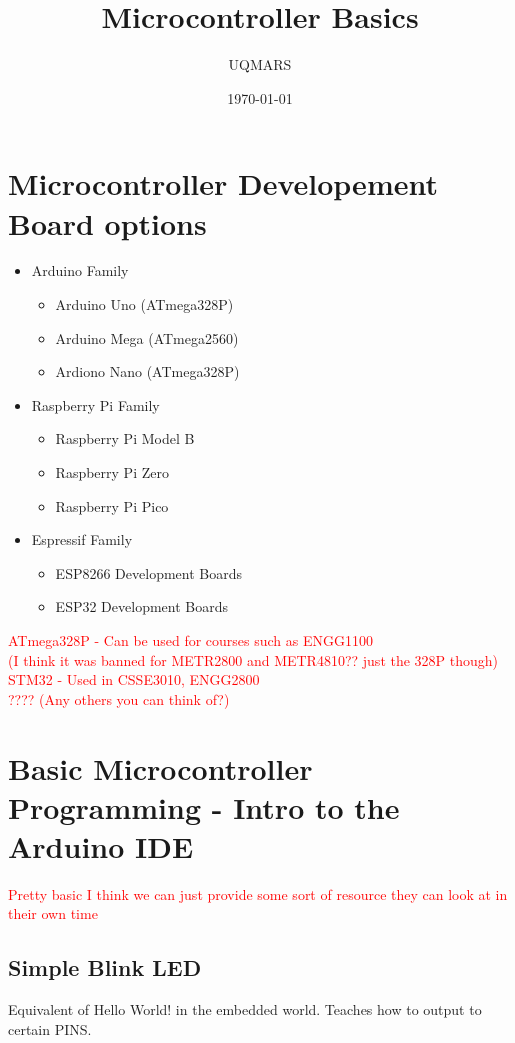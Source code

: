 \documentclass[11pt]{article}
\title{Microcontroller Basics} %
\author{UQMARS}
\date{\today}
\begin{document}
\maketitle
\pagebreak
\section*{Microcontroller Developement Board options}
\begin{itemize}
    \item Arduino Family
    \begin{itemize}
        \item Arduino Uno (ATmega328P)
        \item Arduino Mega (ATmega2560)
        \item Ardiono Nano (ATmega328P)
    \end{itemize}
    \item Raspberry Pi Family 
    \begin{itemize}
        \item Raspberry Pi Model B
        \item Raspberry Pi Zero
        \item Raspberry Pi Pico
    \end{itemize}
    \item Espressif Family
    \begin{itemize}
        \item ESP8266 Development Boards
        \item ESP32 Development Boards
    \end{itemize}
\end{itemize}

\textcolor{red}{ATmega328P - Can be used for courses such as ENGG1100\\ (I think it was banned for METR2800 and METR4810?? just the 328P though)
STM32 - Used in CSSE3010, ENGG2800\\
???? (Any others you can think of?)}



\section*{Basic Microcontroller Programming - Intro to the Arduino IDE}

\textcolor{red}{Pretty basic I think we can just provide some
sort of resource they can look at in their own time}

\subsection*{Simple Blink LED}
Equivalent of Hello World! in the embedded world. Teaches how to output to certain PINS.
\end{document}

